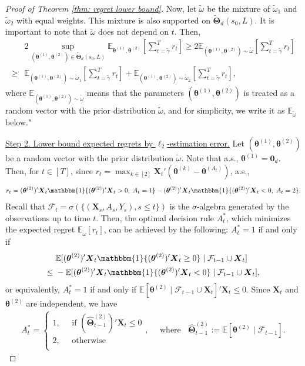\documentclass[aos,preprint]{imsart}
\theoremstyle{plain}
\theoremstyle{definition}
\newcommand{\bTheta}{\boldsymbol{\Theta}}
\newcommand{\btheta}{\boldsymbol{\theta}}
\newcommand{\bd}[1]{\boldsymbol{#1}}
\newcommand{\idf}{\mathbbm{1}}
\newcommand{\bX}{\boldsymbol{X}}
\newcommand{\hbTheta}{\hat{\boldsymbol{\Theta}}}
\newcommand{\cF}{\mathcal{F}}
\newcommand{\Exp}{\mathbb{E}}
\begin{document}
\begin{appendix}
\begin{proof}[Proof of Theorem \ref{thm: regret lower bound}]
Now, let $\tilde{\omega}$ be the mixture of $\tilde{\omega}_1$ and $\tilde{\omega}_2$ with equal weights. This mixture is also supported on $\widetilde{\bTheta}_{d}(s_0,L)$. It is important to note that $\tilde{\omega}$ does not depend on $t$. Then,
\begin{align*}
   & 2\sup_{(\btheta^{(1)}, \btheta^{(2)}) \in \widetilde{\bTheta}_{d}(s_0,L)}  \Exp_{\btheta^{(1)}, \btheta^{(2)}}\left[\sum_{t=\tilde{\gamma}}^T r_t \right] \geq 2\Exp_{(\btheta^{(1)}, \btheta^{(2)}) \sim \tilde{\omega}}\left[\sum_{t=\tilde{\gamma}}^{T}  r_t  \right] \\
   \geq & \Exp_{(\btheta^{(1)}, \btheta^{(2)}) \sim \tilde{\omega}_1}\left[\sum_{t=\tilde{\gamma}}^{T}  r_t  \right]  + \Exp_{(\btheta^{(1)}, \btheta^{(2)}) \sim \tilde{\omega}_2}\left[\sum_{t=\tilde{\gamma}}^{T}  r_t  \right],
\end{align*}
where $\Exp_{(\btheta^{(1)}, \btheta^{(2)}) \sim \tilde{\omega}}$ means that the parameters $(\btheta^{(1)}, \btheta^{(2)})$ is treated as a random vector with the prior distribution $\tilde{\omega}$, and for simplicity, we write it as $\Exp_{\tilde{\omega}}$ below."


\medskip
\noindent \underline{Step 2. Lower bound  expected regrets by $\ell_2$-estimation error.} Let $(\btheta^{(1)}, \btheta^{(2)})$ be a random vector
with the prior distribution $\tilde{\omega}$. Note that a.s., $\btheta^{(1)} = \bd{0}_d$. Then, for $t \in [T]$, since $r_t = \max_{k \in [2]} \bX_t'\left(\btheta^{(k)} - \btheta^{(A_t)}\right)$,  a.s.,
\begin{align*}
    r_t = (\btheta^{(2)})'\bX_t\idf\{(\btheta^{(2)})'\bX_t > 0,\; A_t = 1\} - (\btheta^{(2)})'\bX_t\idf\{(\btheta^{(2)})'\bX_t < 0,\; A_t = 2\}.
\end{align*}
Recall that $\cF_t = \sigma(\{(\bX_s, A_s, Y_s), s\le t\})$ is the $\sigma$-algebra generated by the observations up to time $t$. Then, the optimal decision rule $A_t^*$, which minimizes the expected regret $\Exp_{\tilde{\omega}}[r_t]$, can be achieved by the following: $A_t^* = 1$ if and only if
\begin{align*}
    &\Exp[(\btheta^{(2)})'\bX_t\idf\{(\btheta^{(2)})'\bX_t \ge 0\}\mid \cF_{t-1}\cup\bX_t]\\
    \leq \; & -\Exp[(\btheta^{(2)})'\bX_t\idf\{(\btheta^{(2)})'\bX_t < 0\}\mid \cF_{t-1}\cup\bX_t],
\end{align*}
or equivalently, $A_t^* = 1$ if and only if $\Exp\left[\btheta^{(2)}\mid \cF_{t-1}\cup\bX_t\right]'\bX_t\le 0$. Since $\bX_{t}$ and $\btheta^{(2)}$ are independent, we have
 \begin{align*}
     A_t^* = \begin{cases}
         1, \; &\text{ if } (\hbTheta_{t-1}^{(2)})'\bX_t \leq 0 \\
         2, \; & \text{ otherwise } \\  
     \end{cases}, \quad \text{ where }\;\; \hbTheta_{t-1}^{(2)} :=  \Exp\left[\btheta^{(2)}\mid \cF_{t-1}\right].
 \end{align*}


\end{proof}
\end{appendix}
\end{document}
